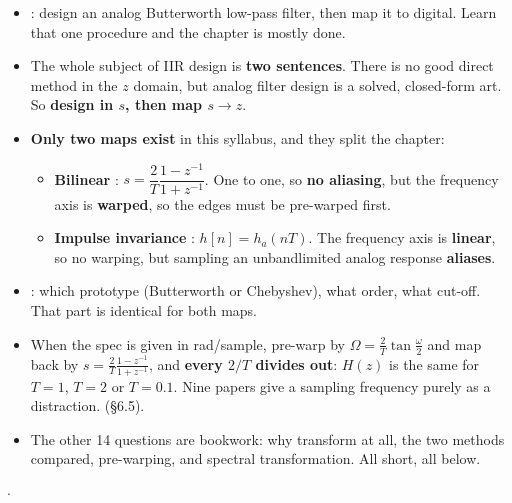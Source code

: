 \begin{itemize}
  \item {}: design an analog Butterworth
        low-pass filter, then map it to digital. Learn that one procedure and the
        chapter is mostly done.
  \item The whole subject of IIR design is \textbf{two sentences}. There is no good
        direct method in the $z$ domain, but analog filter design is a solved,
        closed-form art. So \textbf{design in $s$, then map $s\to z$}.
  \item \textbf{Only two maps exist} in this syllabus, and they split the chapter:
  \begin{itemize}
    \item \textbf{Bilinear} : $s=\dfrac{2}{T}\dfrac{1-z^{-1}}{1+z^{-1}}$. One to
          one, so \textbf{no aliasing}, but the frequency axis is \textbf{warped}, so
          the edges must be pre-warped first.
    \item \textbf{Impulse invariance} : $h[n]=h_a(nT)$. The frequency axis is
          \textbf{linear}, so no warping, but sampling an unbandlimited analog response
          \textbf{aliases}.
  \end{itemize}
  \item {}: which prototype (Butterworth or
        Chebyshev), what order, what cut-off. That part is identical for both maps.
  \item {} When the spec is given in rad/sample, pre-warp
        by $\Omega=\frac{2}{T}\tan\frac{\omega}{2}$ and map back by
        $s=\frac{2}{T}\frac{1-z^{-1}}{1+z^{-1}}$, and
        \textbf{every $2/T$ divides out}: $H(z)$ is the same for $T=1$, $T=2$ or
        $T=0.1$. Nine papers give a sampling frequency purely as a distraction.
         (\S6.5).
  \item The other 14 questions are bookwork: why transform at all, the two methods
        compared, pre-warping, and spectral transformation. All short, all below.
\end{itemize}

\hr


{\color{sub}\footnotesize {} 
\gap$\cdot$\gap {}}

